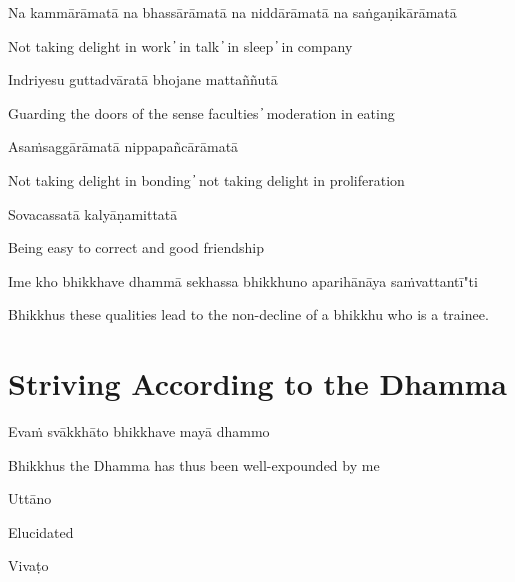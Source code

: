 Na kammārāmatā na bhassārāmatā na niddārāmatā na saṅgaṇikārāmatā

\begin{cprenglish}
Not taking delight in work  ̓  in talk  ̓  in sleep  ̓  in company
\end{cprenglish}

Indriyesu guttadvāratā bhojane mattaññutā

\begin{cprenglish}
Guarding the doors of the sense faculties  ̓  moderation in eating
\end{cprenglish}

Asaṁsaggārāmatā nippapañcārāmatā

\begin{cprenglish}
Not taking delight in bonding  ̓  not taking delight in proliferation
\end{cprenglish}

Sovacassatā kalyāṇamittatā

\begin{cprenglish}
Being easy to correct and good friendship
\end{cprenglish}

Ime kho bhikkhave dhammā sekhassa bhikkhuno aparihānāya saṁvattantī"ti

\begin{cprenglish}
Bhikkhus these qualities lead to the non-decline of a bhikkhu who is a trainee.
\end{cprenglish}


\section*{Striving According to the Dhamma}

\begin{leader}
\end{leader}

Evaṁ svākkhāto bhikkhave mayā dhammo

\begin{cprenglish}
Bhikkhus the Dhamma has thus been well-expounded by me
\end{cprenglish}

Uttāno

\begin{cprenglish}
Elucidated
\end{cprenglish}

Vivaṭo

